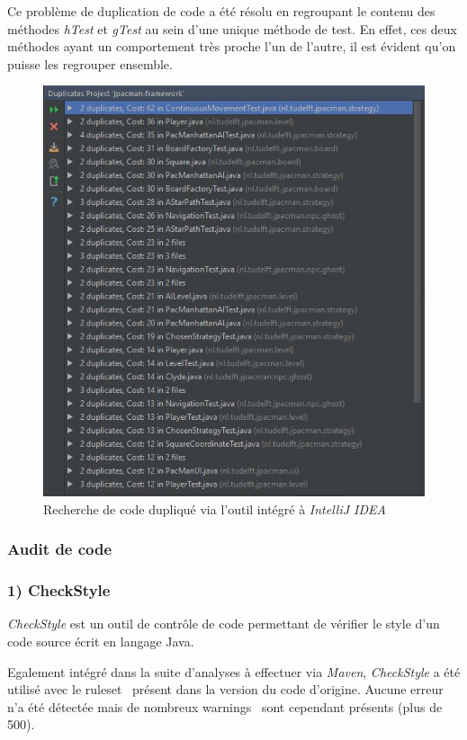 \documentclass[12pt, openany]{report}
\begin{document}
Ce problème de duplication de code a été résolu en regroupant le contenu des méthodes \textit{hTest} et \textit{gTest} au sein d'une unique méthode de test. En effet, ces deux méthodes ayant un comportement très proche l'un de l'autre, il est évident qu'on puisse les regrouper ensemble.


\begin{figure}[h]
	\centering
	\includegraphics{Images/duplicate_analysis.JPG}
	\caption{\label{duplicate} Recherche de code dupliqué via l'outil intégré à \textit{IntelliJ IDEA}}
\end{figure}

\subsubsection{Audit de code}
\subsubsection*{1) CheckStyle}

\textit{CheckStyle} est un outil de contrôle de code permettant de vérifier le style d'un code source écrit en langage Java.

Egalement intégré dans la suite d'analyses à effectuer via \textit{Maven}, \textit{CheckStyle} a été utilisé avec le \og ruleset \fg \, présent dans la version du code d'origine.
Aucune erreur n'a été détectée mais de nombreux \og warnings \fg \, sont cependant présents (plus de 500). 
\end{document}
